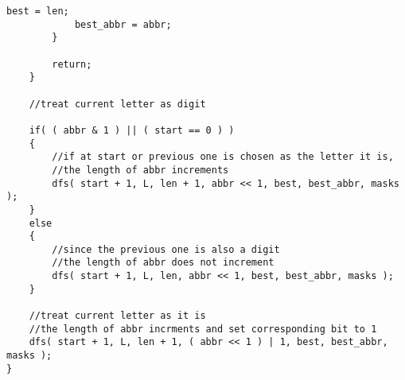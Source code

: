 \begin{lstlisting}[style=customc, caption={Bit Mask}]
            best = len;
            best_abbr = abbr;
        }

        return;
    }

    //treat current letter as digit

    if( ( abbr & 1 ) || ( start == 0 ) )
    {
        //if at start or previous one is chosen as the letter it is,
        //the length of abbr increments
        dfs( start + 1, L, len + 1, abbr << 1, best, best_abbr, masks );
    }
    else
    {
        //since the previous one is also a digit
        //the length of abbr does not increment
        dfs( start + 1, L, len, abbr << 1, best, best_abbr, masks );
    }

    //treat current letter as it is
    //the length of abbr incrments and set corresponding bit to 1
    dfs( start + 1, L, len + 1, ( abbr << 1 ) | 1, best, best_abbr, masks );
}
\end{lstlisting}